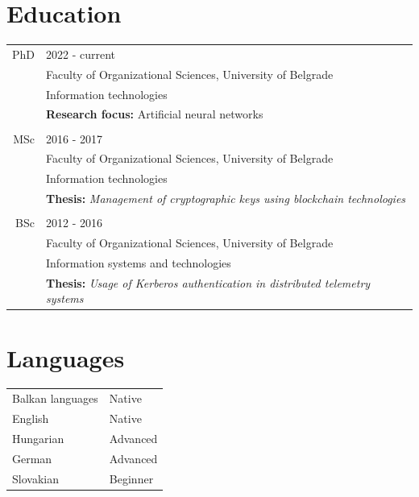 \documentclass[a4paper]{article}
\begin{document}
\section{Education}
\begin{tabular}{@{}r | l}
    PhD & 2022 - current                                                                            \\
        & Faculty of Organizational Sciences, University of Belgrade                                \\
        & Information technologies                                                                  \\
        & \textbf{Research focus: } Artificial neural networks                                      \\                                                                         \\
    MSc & 2016 - 2017                                                                               \\
        & Faculty of Organizational Sciences, University of Belgrade                                \\
        & Information technologies                                                                  \\
        & \textbf{Thesis:} \emph{Management of cryptographic keys using blockchain technologies}    \\
        &                                                                                           \\
    BSc & 2012 - 2016                                                                               \\
        & Faculty of Organizational Sciences, University of Belgrade                                \\
        & Information systems and technologies                                                      \\
        & \textbf{Thesis:} \emph{Usage of Kerberos authentication in distributed telemetry systems}
\end{tabular}

\section{Languages}
\begin{tabular}{@{}l | l}
    Balkan languages & Native   \\
    English          & Native   \\
    Hungarian        & Advanced \\
    German           & Advanced \\
    Slovakian        & Beginner \\
\end{tabular}
\end{document}
